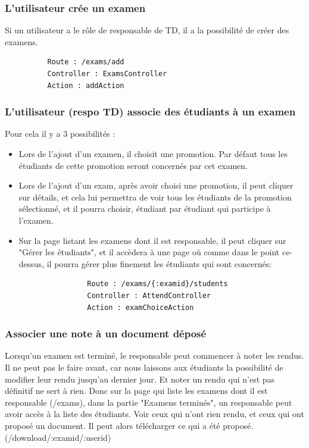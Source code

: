 \documentclass{report}
\begin{document}
      \subsubsection{L'utilisateur crée un examen}
        Si un utilisateur a le rôle de responsable de TD, il a la possibilité
        de créer des examens.        
        \begin{verbatim}
          Route : /exams/add
          Controller : ExamsController
          Action : addAction
        \end{verbatim}

      \subsubsection{L'utilisateur (respo TD) associe des étudiants à un examen}
        Pour cela il y a 3 possibilités :
        \begin{itemize}
          \item{
              Lors de l'ajout d'un examen, il choisit une promotion. Par défaut
              tous les étudiants de cette promotion seront concernés par cet
              examen.
            }
          \item{
              Lors de l'ajout d'un exam, après avoir choisi une promotion, il peut
              cliquer sur détails, et cela lui permettra de voir tous les étudiants
              de la promotion sélectionné, et il pourra choisir, étudiant par
              étudiant qui participe à l'examen.
            }
          \item{
              Sur la page listant les examens dont il est responsable, il peut
              cliquer sur "Gérer les étudiants", et il accèdera à une page où
              comme dans le point ce-dessus, il pourra gérer plus finement les
              étudiants qui sont concernés:
              \vspace{1em}
              \begin{verbatim}
                Route : /exams/{:examid}/students
                Controller : AttendController
                Action : examChoiceAction
              \end{verbatim}
            }
        \end{itemize}

      \subsubsection{Associer une note à un document déposé}
        Lorsqu'un examen est terminé, le responsable peut commencer à noter les rendus.
        Il ne peut pas le faire avant, car nous laissons aux étudiants la possibilité
        de modifier leur rendu jusqu'au dernier jour. Et noter un rendu qui n'est pas
        définitif ne sert à rien.
        Donc sur la page qui liste les examens dont il est responsable
        (/exams), dans la partie "Examens terminés",
        un responsable peut avoir accès à la liste des étudiants. Voir ceux qui
        n'ont rien rendu, et ceux qui ont proposé un document. Il peut alors
        télécharger ce qui a été proposé. 
        (/download/{:examid}/{:userid})
\end{document}
